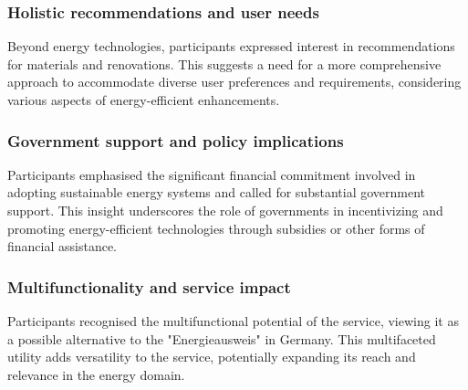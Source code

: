 \subsubsection*{Holistic recommendations and user needs}

Beyond energy technologies, participants expressed interest in recommendations for materials and renovations. 
This suggests a need for a more comprehensive approach to accommodate diverse user preferences and requirements, considering various aspects of energy-efficient enhancements.


\subsubsection*{Government support and policy implications}

Participants emphasised the significant financial commitment involved in adopting sustainable energy systems and called for substantial government support. 
This insight underscores the role of governments in incentivizing and promoting energy-efficient technologies through subsidies or other forms of financial assistance.


\subsubsection*{Multifunctionality and service impact}

Participants recognised the multifunctional potential of the service, viewing it as a possible alternative to the "Energieausweis" in Germany. 
This multifaceted utility adds versatility to the service, potentially expanding its reach and relevance in the energy domain. 


